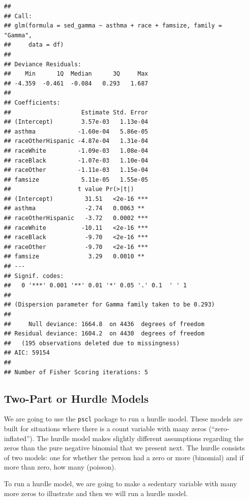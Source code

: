 \documentclass[]{tufte-book}
\theoremstyle{definition}
\theoremstyle{definition}
\theoremstyle{remark}
\begin{document}
\begin{verbatim}
## 
## Call:
## glm(formula = sed_gamma ~ asthma + race + famsize, family = "Gamma", 
##     data = df)
## 
## Deviance Residuals: 
##    Min      1Q  Median      3Q     Max  
## -4.359  -0.461  -0.084   0.293   1.687  
## 
## Coefficients:
##                    Estimate Std. Error
## (Intercept)        3.57e-03   1.13e-04
## asthma            -1.60e-04   5.86e-05
## raceOtherHispanic -4.87e-04   1.31e-04
## raceWhite         -1.09e-03   1.08e-04
## raceBlack         -1.07e-03   1.10e-04
## raceOther         -1.11e-03   1.15e-04
## famsize            5.11e-05   1.55e-05
##                   t value Pr(>|t|)    
## (Intercept)         31.51   <2e-16 ***
## asthma              -2.74   0.0063 ** 
## raceOtherHispanic   -3.72   0.0002 ***
## raceWhite          -10.11   <2e-16 ***
## raceBlack           -9.70   <2e-16 ***
## raceOther           -9.70   <2e-16 ***
## famsize              3.29   0.0010 ** 
## ---
## Signif. codes:  
##   0 '***' 0.001 '**' 0.01 '*' 0.05 '.' 0.1  ' ' 1
## 
## (Dispersion parameter for Gamma family taken to be 0.293)
## 
##     Null deviance: 1664.8  on 4436  degrees of freedom
## Residual deviance: 1604.2  on 4430  degrees of freedom
##   (195 observations deleted due to missingness)
## AIC: 59154
## 
## Number of Fisher Scoring iterations: 5
\end{verbatim}

\subsection*{Two-Part or Hurdle Models}\label{two-part-or-hurdle-models}

We are going to use the \texttt{pscl} package to run a hurdle model.
These models are built for situations where there is a count variable
with many zeros (``zero-inflated''). The hurdle model makes slightly
different assumptions regarding the zeros than the pure negative
binomial that we present next. The hurdle consists of two models: one
for whether the person had a zero or more (binomial) and if more than
zero, how many (poisson).

To run a hurdle model, we are going to make a sedentary variable with
many more zeros to illustrate and then we will run a hurdle model.
\end{document}
